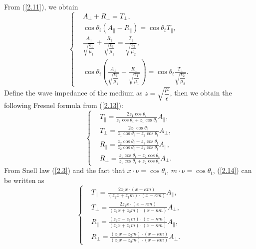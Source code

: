 \documentclass[a4paper,12pt,]{article}
\numberwithin{equation}{section}
\numberwithin{equation}{section} \allowdisplaybreaks
\begin{document}
From (\ref{2.11}), we obtain
\begin{equation}\label{2.13}
  \left\{
  \begin{split}
       & A_{\bot} + R_{\bot} = T_{\bot}, \\
       & \cos\theta_{i}(A_{\parallel} - R_{\parallel}) = \cos\theta_{t}T_{\parallel}, \\
       & \frac{A_{\parallel}}{\sqrt{\dfrac{\epsilon_{1}}{\mu_{1}}}} +  \frac{R_{\parallel}}{\sqrt{\dfrac{\epsilon_{1}}{\mu_{1}}}} = \frac{T_{\parallel}}{\sqrt{\dfrac{\epsilon_{2}}{\mu_{2}}}}, \\
       & \cos\theta_{i}\left(\frac{A_{\bot}}{\sqrt{\dfrac{\epsilon_{1}}{\mu_{1}}}} - \frac{R_{\bot}}{\sqrt{\dfrac{\epsilon_{1}}{\mu_{1}}}}\right) = \cos\theta_{t} \frac{T_{\bot}}{\sqrt{\dfrac{\epsilon_{2}}{\mu_{2}}}}.
  \end{split}
  \right.
\end{equation}
Define the wave impedance of the medium as $z = \sqrt{\dfrac{\mu}{\epsilon}}$, then we obtain the following Fresnel formula from (\ref{2.13}):
\begin{equation}\label{2.14}
  \left\{
  \begin{split}
       & T_{\parallel} = \frac{2z_{1}\cos\theta_{i}}{z_{2} \cos\theta_{i} + z_{1}\cos\theta_{t}}A_{\parallel}, \\
       & T_{\bot} = \frac{2z_{1}\cos\theta_{i}}{z_{1}\cos\theta_{i} +  z_{2} \cos\theta_{t}}A_{\bot}, \\
       & R_{\parallel} =  \frac{z_{2} \cos\theta_{i} - z_{1}\cos\theta_{t}}{z_{2} \cos\theta_{i} + z_{1}\cos\theta_{t}}A_{\parallel},\\
       & R_{\bot} = \frac{z_{1}\cos\theta_{i} -  z_{2} \cos\theta_{t}}{z_{1}\cos\theta_{i} +  z_{2} \cos\theta_{t}}A_{\bot}.
  \end{split}
  \right.
\end{equation}
From Snell law (\ref{2.3}) and the fact that $x \cdot \nu = \cos\theta_{i}$, $m \cdot \nu = \cos\theta_{t}$, (\ref{2.14}) can be written as
\begin{equation}\label{2.15}
  \left\{
  \begin{split}
       & T_{\parallel} = \frac{2 z_{1} x\cdot (x-\kappa m)}{(z_{2} x + z_{1} m)\cdot (x - \kappa m)}A_{\parallel}, \\
       & T_{\bot} = \frac{2 z_{1} x\cdot (x-\kappa m)}{(z_{1} x + z_{2} m) \cdot (x - \kappa m)}A_{\bot}, \\
       & R_{\parallel} = \frac{(z_{2} x - z_{1} m)\cdot (x - \kappa m)}{(z_{2} x + z_{1} m)\cdot (x - \kappa m)}A_{\parallel}, \\
       & R_{\bot} = \frac{(z_{1} x - z_{2} m) \cdot (x - \kappa m)}{(z_{1} x + z_{2} m) \cdot (x - \kappa m)}A_{\bot}.
  \end{split}
  \right.
\end{equation}
\end{document}
